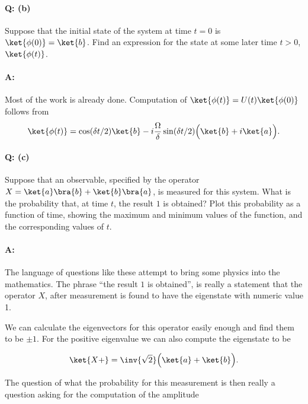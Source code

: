 {\paragraph{Q: (b)}
Suppose that the initial state of the system at time \(t = 0\) is \(\ket{\phi(0)}= \ket{b}\).  Find an expression for the state at some later time \(t > 0\), \(\ket{\phi(t)}\).
\paragraph{A:}
Most of the work is already done.  Computation of \(\ket{\phi(t)} = U(t) \ket{\phi(0)}\) follows from 
\begin{equation}\label{eqn:qmIexamPractice2008Dec:2:110}
\ket{\phi(t)} =
\cos(\delta t/2) \ket{b}
- i \frac{\Omega}{\delta} \sin(\delta t/2) \Bigl(
\ket{b} +i \ket{a}
\Bigr).
\end{equation}

\paragraph{Q: (c)}

Suppose that an observable, specified by the operator \(X = \ket{a}\bra{b} + \ket{b}\bra{a}\), is measured for this system.  What is the probability that, at time \(t\), the result \(1\) is obtained?  Plot this probability as a function of time, showing the maximum and minimum values of the function, and the corresponding values of \(t\).

\paragraph{A:}

The language of questions like these attempt to bring some physics into the mathematics.  The phrase ``the result \(1\) is obtained'', is really a statement that the operator \(X\), after measurement is found to have the eigenstate with numeric value 1.

We can calculate the eigenvectors for this operator easily enough and find them to be \(\pm 1\).  For the positive eigenvalue we can also compute the eigenstate to be

\begin{equation}\label{eqn:qmIexamPractice2008Dec:2:120}
\ket{X+} = \inv{\sqrt{2}} \Bigl( \ket{a} + \ket{b} \Bigr).
\end{equation}

The question of what the probability for this measurement is then really a question asking for the computation of the amplitude

}
